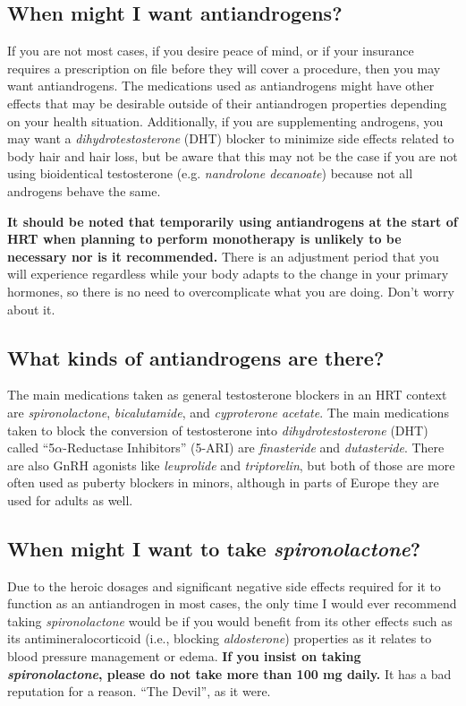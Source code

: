 \documentclass{article}
\begin{document}
\subsection{When might I want antiandrogens?}

If you are not most cases, if you desire peace of mind, or if your insurance requires a prescription on file before they will cover a procedure, then you may want antiandrogens. The medications used as antiandrogens might have other effects that may be desirable outside of their antiandrogen properties depending on your health situation. Additionally, if you are supplementing androgens, you may want a \textit{dihydrotestosterone} (DHT) blocker to minimize side effects related to body hair and hair loss, but be aware that this may not be the case if you are not using bioidentical testosterone (e.g. \textit{nandrolone decanoate}) because not all androgens behave the same.

\textbf{It should be noted that temporarily using antiandrogens at the start of HRT when planning to perform monotherapy is unlikely to be necessary nor is it recommended.} There is an adjustment period that you will experience regardless while your body adapts to the change in your primary hormones, so there is no need to overcomplicate what you are doing. Don't worry about it.

\subsection{What kinds of antiandrogens are there?}

The main medications taken as general testosterone blockers in an HRT context are \textit{spironolactone}, \textit{bicalutamide}, and \textit{cyproterone acetate}. The main medications taken to block the conversion of testosterone into \textit{dihydrotestosterone} (DHT) called “5$\alpha$-Reductase Inhibitors” (5-ARI) are \textit{finasteride} and \textit{dutasteride}. There are also GnRH agonists like \textit{leuprolide} and \textit{triptorelin}, but both of those are more often used as puberty blockers in minors, although in parts of Europe they are used for adults as well.

\subsection{When might I want to take \textit{spironolactone}?}

Due to the heroic dosages and significant negative side effects required for it to function as an antiandrogen in most cases, the only time I would ever recommend taking \textit{spironolactone} would be if you would benefit from its other effects such as its antimineralocorticoid (i.e., blocking \textit{aldosterone}) properties as it relates to blood pressure management or edema. \textbf{If you insist on taking \textit{spironolactone}, please do not take more than 100 mg daily.} It has a bad reputation for a reason. “The Devil”, as it were.
\end{document}
